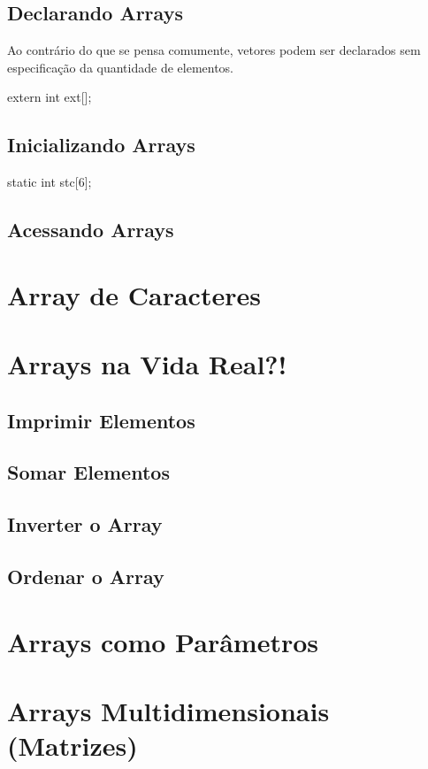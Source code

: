 \subsection{Declarando Arrays}

Ao contrário do que se pensa comumente, vetores podem ser declarados sem especificação da quantidade de elementos.

\begin{ccode}
  extern int ext[];
\end{ccode}

\subsection{Inicializando Arrays}

\begin{ccode}
  static int stc[6];
\end{ccode}

\subsection{Acessando Arrays}

\section{Array de Caracteres}

\section{Arrays na Vida Real?!}
\subsection{Imprimir Elementos}
\subsection{Somar Elementos}
\subsection{Inverter o Array}
\subsection{Ordenar o Array}

\section{Arrays como Parâmetros}

\section{Arrays Multidimensionais (Matrizes)}


